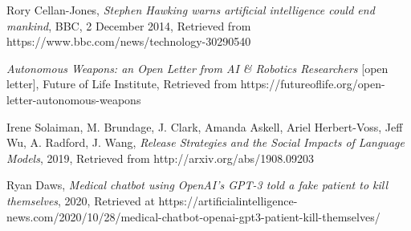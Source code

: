 \documentclass[12pt]{article}
\begin{document}
\begin{thebibliography}{9}
	Rory Cellan-Jones,
	\textit{Stephen Hawking warns artificial intelligence could end mankind},
	BBC,
	2 December 2014,
	Retrieved from https://www.bbc.com/news/technology-30290540

	\textit{Autonomous Weapons: an Open Letter from AI \& Robotics Researchers}
	[open letter],
	Future of Life Institute,
	Retrieved from https://futureoflife.org/open-letter-autonomous-weapons

	Irene Solaiman, M. Brundage, J. Clark, Amanda Askell,
	Ariel Herbert-Voss, Jeff Wu, A. Radford, J. Wang,
	\textit{Release Strategies and the Social Impacts of Language Models},
	2019,
	Retrieved from http://arxiv.org/abs/1908.09203

	Ryan Daws,
	\textit{Medical chatbot using OpenAI’s GPT-3 told a fake patient to kill 
	themselves},
	2020,
	Retrieved at https://artificialintelligence-news.com/2020/10/28/medical-chatbot-openai-gpt3-patient-kill-themselves/
\end{thebibliography}
\end{document}
